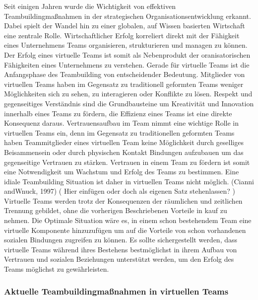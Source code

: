 \documentclass[a4paper,11pt]{article}%
\renewcommand{\\}{\vspace*{0.5\baselineskip} \newline}
\begin{document}
{Seit einigen Jahren wurde die Wichtigkeit von effektiven Teambuildingmaßnahmen in der strategischen Organisationsentwicklung erkannt. Dabei spielt der Wandel hin zu einer globalen, auf Wissen basierten Wirtschaft eine zentrale Rolle. \citep{belbin2011management} \citep[p.7]{katzenbach2015wisdom}
Wirtschaftlicher Erfolg korreliert direkt mit der Fähigkeit eines Unternehmens Teams organisieren, strukturieren und managen zu können. \citep{pasmore1993designing}
Der Erfolg eines virtuelle Teams ist somit als Nebenprodukt der oranisatorischen Fähigkeiten eines Unternehmens zu verstehen. \citep[Chapter.5]{kling1994social}
	Gerade für virtuelle Teams ist die Anfangsphase des Teambuilding von entscheidender Bedeutung. Mitglieder von virtuellen Teams haben im Gegensatz zu traditionell geformten Teams weniger Möglichkeiten sich zu sehen, zu interagieren oder Konflikte zu lösen. 
Respekt und gegenseitiges Verständnis sind die Grundbausteine um Kreativität und Innovation innerhalb eines Teams zu fördern, die Effizienz eines Teams ist eine direkte Konsequenz daraus.
Vertrauensaufbau im Team nimmt eine wichtige Rolle in virtuellen Teams ein, denn im Gegensatz zu traditionellen geformten Teams haben Teammitglieder eines virtuellen Team keine Möglichkeit durch geselliges Beisammensein oder durch physischen Kontakt Bindungen aufzubauen um das gegenseitige Vertrauen zu stärken.\citep{TrustAndTheVirtualOrganisation}  \\
Vertrauen in einem Team zu fördern ist somit eine Notwendigkeit um Wachstum und Erfolg des Teams zu bestimmen. 
\citep{glacel1997teamwork} \\
Eine idiale Teambuilding Situation ist daher in virtuellen Teams nicht möglich. (Cianni andWnuck, 1997) ( Hier einfügen oder doch als eigenen Satz stehenlassen? )
Virtuelle Teams werden trotz der Konsequenzen der räumlichen und zeitlichen Trennung gebildet, ohne die vorherigen Beschriebenen Vorteile in kauf zu nehmen. Die Optimale Situation wäre es, in einem schon bestehendem Team eine virtuelle Komponente hinzuzufügen um auf die Vorteile von schon vorhandenen sozialen Bindungen zugreifen zu können. \citep[p.36-37]{holton2001building}
Es sollte sichergestellt werden, dass virtuelle Teams während ihres Bestehens bestmöglichst in ihrem Aufbau von Vertrauen und sozialen Beziehungen unterstützt werden, um den Erfolg des Teams möglichst zu gewährleisten.

	\subsubsection{Aktuelle Teambuildingmaßnahmen in virtuellen Teams}


}
\end{document}
